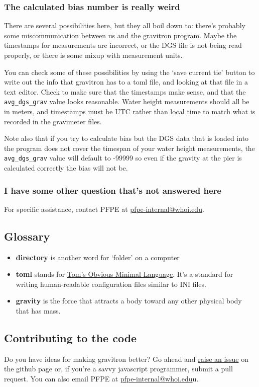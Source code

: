 \documentclass{pfpe-manual}
\begin{document}
\subsubsection{The calculated bias number is really weird}
There are several possibilities here, but they all boil down to: there's probably some miscommunication between us and the gravitron program. Maybe the timestamps for measurements are incorrect, or the DGS file is not being read properly, or there is some mixup with measurement units. 

You can check some of these possibilities by using the `save current tie' button to write out the info that gravitron has to a toml file, and looking at that file in a text editor. Check to make sure that the timestamps make sense, and that the \texttt{avg\_dgs\_grav} value looks reasonable. Water height measurements should all be in meters, and timestamps must be UTC rather than local time to match what is recorded in the gravimeter files.

Note also that if you try to calculate bias but the DGS data that is loaded into the program does not cover the timespan of your water height measurements, the \texttt{avg\_dgs\_grav} value will default to -99999 so even if the gravity at the pier is calculated correctly the bias will not be.

\subsubsection{I have some other question that's not answered here}
For specific assistance, contact PFPE at \href{mailto:pfpe-internal@whoi.edu}{pfpe-internal@whoi.edu}.

\subsection{Glossary}
\begin{itemize}
\item \textbf{directory} is another word for `folder' on a computer
\item \textbf{toml} stands for \href{https://toml.io/}{Tom's Obvious Minimal Language}. It's a standard for writing human-readable configuration files similar to INI files.
\item \textbf{gravity} is the force that attracts a body toward any other physical body that has mass.
\end{itemize}

\subsection{Contributing to the code}
Do you have ideas for making gravitron better? Go ahead and \href{https://github.com/hfmark/gravitron/issues}{raise an issue} on the github page or, if you're a savvy javascript programmer, submit a pull request. You can also email PFPE at \href{mailto:pfpe-internal@whoi.edu}{pfpe-internal@whoi.edu}u.
\end{document}
